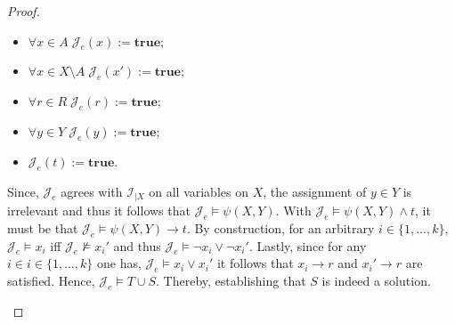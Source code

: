 \documentclass [11pt]{article}
\newcommand{\True}{\mathbf{true}}
\newcommand{\lto}{\rightarrow}
\newcommand{\nmodels}{\not\models}
\begin{document}
\begin{proof}
\begin{itemize}
\begin{itemize}
\item $\forall x \in A \; \mathcal{J}_e(x) := \True$;
\item $\forall x \in X \setminus A \; \mathcal{J}_e(x') := \True$;
\item $\forall r \in R \; \mathcal{J}_e(r) := \True$;
\item $\forall y \in Y \; \mathcal{J}_e(y) := \True$;
\item $\mathcal{J}_e(t) := \True$.
\end{itemize}
Since, $\mathcal{J}_e$ agrees with $\mathcal{I}_{|X}$ on all variables on $X$, the assignment of $y \in Y$ is irrelevant and thus it follows that $\mathcal{J}_e \models \psi(X,Y)$. With $\mathcal{J}_e \models \psi(X,Y) \land t$, it must be that $\mathcal{J}_e \models \psi(X,Y) \to t$. By construction, for an arbitrary $i \in \{1, \dots , k\}$, $\mathcal{J}_e \models x_i$ iff $\mathcal{J}_e \nmodels x_i'$ and thus $\mathcal{J}_e \models \neg x_i \lor \neg x_i'$. Lastly, since for any $i \in i \in \{1, \dots , k\}$ one has, $\mathcal{J}_e \models x_i \lor x_i'$ it follows  that $x_i \lto r$ and $x_i' \lto r$ are satisfied. Hence, $\mathcal{J}_e \models T \cup S$. Thereby, establishing that $S$ is indeed a solution. 



\end{itemize}
\end{proof}
\end{document}
